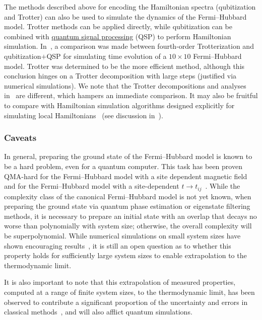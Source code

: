 \begin{refsection}
The methods described above for encoding the Hamiltonian spectra (qubitization and Trotter) can also be used to simulate the dynamics of the Fermi--Hubbard model. Trotter methods can be applied directly, while qubitization can be combined with \hyperref[prim:QSPqubitization]{quantum signal processing} (QSP) to perform Hamiltonian simulation. In~\cite{flannigan2022}, a comparison was made between fourth-order Trotterization and qubitization$+$QSP for simulating time evolution of a $10 \times 10$ Fermi--Hubbard model. Trotter was determined to be the more efficient method, although this conclusion hinges on a Trotter decomposition with large steps (justified via numerical simulations). We note that the Trotter decompositions and analyses in~\cite{CampbellHubbard22,flannigan2022} are different, which hampers an immediate comparison. It may also be fruitful to compare with Hamiltonian simulation algorithms designed explicitly for simulating local Hamiltonians~\cite{haah2018QAlgSimLatticeHam} (see discussion in~\cite{babbush2018EncodingElectronicSpectraLinearT}). 




\subsubsection*{Caveats}\label{FHcaveats}
In general, preparing the ground state of the Fermi--Hubbard model is known to be a hard problem, even for a quantum computer. This task has been proven QMA-hard for the Fermi--Hubbard model with a site dependent magnetic field~\cite{schuch2009} and for the Fermi--Hubbard model with a site-dependent $t \rightarrow t_{ij}$~\cite{Ogorman2022ElectronicStructureQMA}. While the complexity class of the canonical Fermi--Hubbard model is not yet known, when preparing the ground state via quantum phase estimation or eigenstate filtering methods,  it is necessary to prepare an initial state with an overlap that decays no worse than polynomially with system size; otherwise, the overall complexity will be superpolynomial. While numerical simulations on small system sizes have shown encouraging results~\cite{tubman2018PostponingCatastrophe,Lemieux2021_GS_prep}, it is still an open question as to whether this property holds for sufficiently large system sizes to enable extrapolation to the thermodynamic limit.

It is also important to note that this extrapolation of measured properties, computed at a range of finite system sizes, to the thermodynamic limit, has been observed to contribute a significant proportion of the uncertainty and errors in classical methods~\cite{leblanc2015TwoDimHubbard}, and will also afflict quantum simulations.


\end{refsection}
